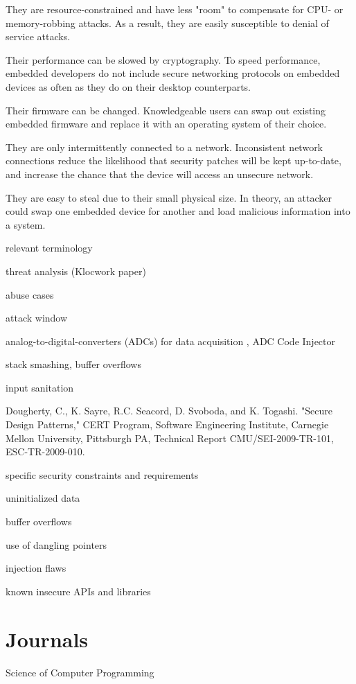 \documentclass[draftcls,onecolumn,conference,12pt]{IEEEtran}
\begin{document}
		They are resource-constrained and have less "room" to compensate for CPU- or memory-robbing attacks. As a result, they are easily susceptible to denial of service attacks.

Their performance can be slowed by cryptography. To speed performance, embedded developers do not include secure networking protocols on embedded devices as often as they do on their desktop counterparts.

Their firmware can be changed. Knowledgeable users can swap out existing embedded firmware and replace it with an operating system of their choice.

They are only intermittently connected to a network. Inconsistent network connections reduce the likelihood that security patches will be kept up-to-date, and increase the chance that the device will access an unsecure network.

They are easy to steal due to their small physical size. In theory, an attacker could swap one embedded device for another and load malicious information into a system.


	relevant terminology 

		threat analysis (Klocwork paper)

		abuse cases

		attack window

		analog-to-digital-converters (ADCs) for data acquisition , ADC Code Injector

		stack smashing, buffer overflows

		input sanitation

		Dougherty, C., K. Sayre, R.C. Seacord, D. Svoboda, and K. Togashi. "Secure Design Patterns," CERT Program, Software Engineering Institute, Carnegie Mellon University, Pittsburgh PA, Technical Report CMU/SEI-2009-TR-101, ESC-TR-2009-010.

specific security constraints and requirements

		uninitialized data

		 buffer overflows

use of dangling pointers

injection flaws

known insecure APIs and libraries


\section{Journals}

Science of Computer Programming
\end{document}
